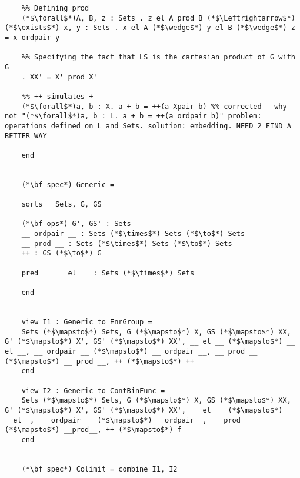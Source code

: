 \documentclass[preview]{standalone}
\begin{document}
\begin{lstlisting}
	%% Defining prod
	(*$\forall$*)A, B, z : Sets . z el A prod B (*$\Leftrightarrow$*) (*$\exists$*) x, y : Sets . x el A (*$\wedge$*) y el B (*$\wedge$*) z = x ordpair y 
	
	%% Specifying the fact that LS is the cartesian product of G with G
	. XX' = X' prod X'  
	
	%% ++ simulates +
	(*$\forall$*)a, b : X. a + b = ++(a Xpair b) %% corrected	why not "(*$\forall$*)a, b : L. a + b = ++(a ordpair b)" problem: operations defined on L and Sets. solution: embedding. NEED 2 FIND A BETTER WAY
	
	end
	
	
	(*\bf spec*) Generic = 
	
	sorts	Sets, G, GS
	
	(*\bf ops*) G', GS' : Sets
	__ ordpair __ : Sets (*$\times$*) Sets (*$\to$*) Sets
	__ prod __ : Sets (*$\times$*) Sets (*$\to$*) Sets
	++ : GS (*$\to$*) G
	
	pred	__ el __ : Sets (*$\times$*) Sets
	
	end
	
	
	view I1 : Generic to EnrGroup =
	Sets (*$\mapsto$*) Sets, G (*$\mapsto$*) X, GS (*$\mapsto$*) XX, G' (*$\mapsto$*) X', GS' (*$\mapsto$*) XX', __ el __ (*$\mapsto$*) __ el __, __ ordpair __ (*$\mapsto$*) __ ordpair __, __ prod __ (*$\mapsto$*) __ prod __, ++ (*$\mapsto$*) ++
	end
	
	view I2 : Generic to ContBinFunc =
	Sets (*$\mapsto$*) Sets, G (*$\mapsto$*) X, GS (*$\mapsto$*) XX, G' (*$\mapsto$*) X', GS' (*$\mapsto$*) XX', __ el __ (*$\mapsto$*) __el__, __ ordpair __ (*$\mapsto$*) __ordpair__, __ prod __ (*$\mapsto$*) __prod__, ++ (*$\mapsto$*) f
	end
	
	
	(*\bf spec*) Colimit = combine I1, I2
\end{lstlisting}
\end{document}

